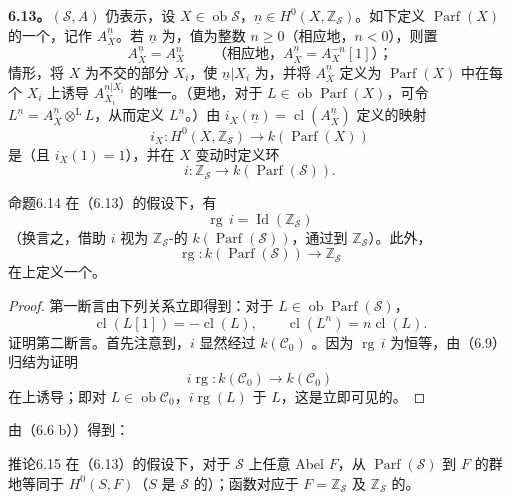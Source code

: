 \textbf{6.13。}$(\mathscr S,A)$ 仍表示，设 $X\in\operatorname{ob}\mathscr S$，$\underline n\in H^0(X,\mathbb Z_{\mathscr S})$。如下定义 $\operatorname{Parf}(X)$ 的一个，记作 $A_X^{\underline n}$。若 $\underline n$ 为，值为整数 $n\geq0$（相应地，$n<0$），则置
\[A_X^{\underline n}=A_X^n\qquad\text{（相应地，}A_X^{\underline n}=A_X^{-n}[1]\text{）；}\]
情形，将 $X$ 为不交的部分 $X_i$，使 $\underline n|X_i$ 为，并将 $A_X^{\underline n}$ 定义为 $\operatorname{Parf}(X)$ 中在每个 $X_i$ 上诱导 $A_{X_i}^{\underline n|X_i}$ 的唯一。（更地，对于 $L\in\operatorname{ob}\operatorname{Parf}(X)$，可令 $L^{\underline n}=A_X^{\underline n}\otimes^{\mathrm L}L$，从而定义 $L^{\underline n}$。）由 $i_X(\underline n)=\operatorname{cl}(A_X^{\underline n})$ 定义的映射
\[i_X:H^0(X,\mathbb Z_{\mathscr S})\longrightarrow k(\operatorname{Parf}(X))\]
是（且 $i_X(1)=1$），并在 $X$ 变动时定义环
\[i:\mathbb Z_{\mathscr S}\longrightarrow k(\operatorname{Parf}(\mathscr S)).\]

\begin{SGAresult}{命题}{6.14}
在（6.13）的假设下，有
\[\operatorname{rg}\,i=\operatorname{Id}(\mathbb Z_{\mathscr S})\]
（换言之，借助 $i$ 视为 $\mathbb Z_{\mathscr S}$-的 $k(\operatorname{Parf}(\mathscr S))$，通过到 $\mathbb Z_{\mathscr S}$）。此外，
\[\operatorname{rg}:k(\operatorname{Parf}(\mathscr S))\longrightarrow\mathbb Z_{\mathscr S}\]
在上定义一个。
\end{SGAresult}
\begin{proof}
第一断言由下列关系立即得到：对于 $L\in\operatorname{ob}\operatorname{Parf}(\mathscr S)$，
\[\operatorname{cl}(L[1])=-\operatorname{cl}(L),\qquad\operatorname{cl}(L^n)=n\operatorname{cl}(L).\]
证明第二断言。首先注意到，$i$ 显然经过 $k(\mathcal C_0)$ 。因为 $\operatorname{rg}\,i$ 为恒等，由（6.9）归结为证明
\[i\operatorname{rg}:k(\mathcal C_0)\longrightarrow k(\mathcal C_0)\]
在上诱导；即对 $L\in\operatorname{ob}\mathcal C_0$，$i\operatorname{rg}(L)$ 于 $L$，这是立即可见的。
\end{proof}
由（6.6 b））得到：
\begin{SGAresult}{推论}{6.15}
在（6.13）的假设下，对于 $\mathscr S$ 上任意 Abel  $F$，从 $\operatorname{Parf}(\mathscr S)$ 到 $F$ 的群地等同于 $H^0(S,F)$（$S$ 是 $\mathscr S$ 的）；函数对应于 $F=\mathbb Z_{\mathscr S}$ 及 $\mathbb Z_{\mathscr S}$ 的。
\end{SGAresult}

